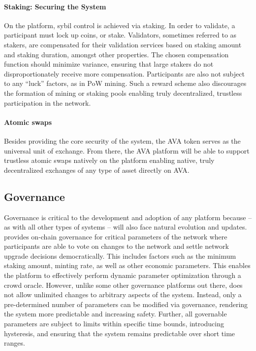 \documentclass[runningheads]{llncs}
\begin{document}
\paragraph{Staking: Securing the System}
On the \AVAPlatformName{} platform, sybil control is achieved via staking. In order to validate, a participant must lock up coins, or stake. Validators, sometimes referred to as stakers, are compensated for their validation services based on staking amount and staking duration, amongst other properties. The chosen compensation function should minimize variance, ensuring that large stakers do not disproportionately receive more compensation. Participants are also not subject to any ``luck'' factors, as in PoW mining. Such a reward scheme also discourages the formation of mining or staking pools enabling truly decentralized, trustless participation in the network.

\paragraph{Atomic swaps}
Besides providing the core security of the system, the AVA token serves as the universal unit of exchange. From there, the AVA platform will be able to support trustless atomic swaps natively on the platform enabling native, truly decentralized exchanges of any type of asset directly on AVA. 

\subsection{Governance}
Governance is critical to the development and adoption of any platform because – as with all other types of systems – \AVAPlatformName{} will also face natural evolution and updates. \AVATokenName{} provides on-chain governance for critical parameters of the network where participants are able to vote on changes to the network and settle network upgrade decisions democratically. This includes factors such as the minimum staking amount, minting rate, as well as other economic parameters. This enables the platform to effectively perform dynamic parameter optimization through a crowd oracle. However, unlike some other governance platforms out there, \AVAPlatformName{} does not allow unlimited changes to arbitrary aspects of the system. Instead, only a pre-determined number of parameters can be modified via governance, rendering the system more predictable and increasing safety. Further, all governable parameters are subject to limits within specific time bounds, introducing hysteresis, and ensuring that the system remains predictable over short time ranges. 
\end{document}
